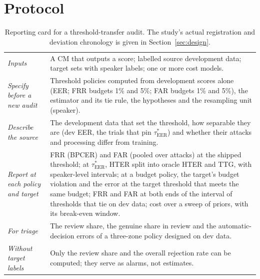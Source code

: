 \documentclass[review,authoryear]{elsarticle}
\newcommand{\tauE}{\tau^{*}_{\mathrm{EER}}}
\begin{document}



\section{Protocol}
\label{sec:protocol}

\begin{table}[!t]
\caption{Reporting card for a threshold-transfer audit. The study's actual registration and deviation chronology is given in Section~\ref{sec:design}.}
\label{tab:card}
\centering
\footnotesize
\setlength{\tabcolsep}{3pt}
\begin{tabular}{@{}p{}p{}@{}}
\toprule
\emph{Inputs} & A CM that outputs a score; labelled source development data; target sets with speaker labels; one or more cost
models. \\
\emph{Specify before a new audit} & Threshold policies computed from development scores alone (EER; FRR budgets 1\% and
5\%; FAR budgets 1\% and 5\%), the estimator and its tie rule, the hypotheses and the resampling unit (speaker). \\
\emph{Describe the source} & The development data that set the threshold, how separable they are (dev EER, the trials
that pin \(\tauE\)) and whether their attacks and processing differ from training. \\
\emph{Report at each policy and target} & FRR (BPCER) and FAR (pooled over attacks) at the shipped threshold; at \(\tauE\),
HTER split into oracle HTER and TTG, with speaker-level intervals; at a budget policy, the target's budget violation and
the error at the target threshold that meets the same budget; FRR and FAR at both ends of the interval of thresholds that
tie on dev data; cost over a sweep of priors, with its break-even window. \\
\emph{For triage} & The review share, the genuine share in review and the automatic-decision errors of a three-zone policy
designed on dev data. \\
\emph{Without target labels} & Only the review share and the overall rejection rate can be computed; they serve as
alarms, not estimates. \\
\bottomrule
\end{tabular}
\end{table}
\end{document}
